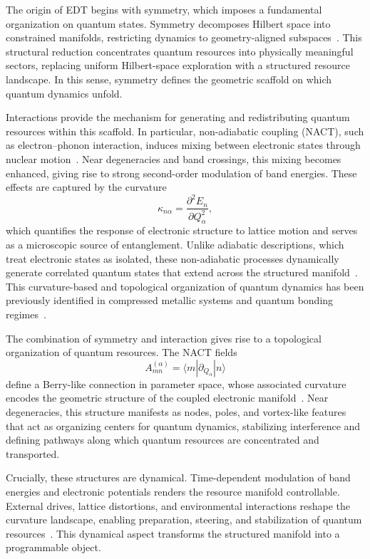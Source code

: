 \documentclass[twocolumn,10pt]{article}
\begin{document}
The origin of EDT begins with symmetry, which imposes a fundamental organization on quantum states. Symmetry decomposes Hilbert space into constrained manifolds, restricting dynamics to geometry-aligned subspaces~\cite{Wigner1959,Georgi1999}. This structural reduction concentrates quantum resources into physically meaningful sectors, replacing uniform Hilbert-space exploration with a structured resource landscape. In this sense, symmetry defines the geometric scaffold on which quantum dynamics unfold.

Interactions provide the mechanism for generating and redistributing quantum resources within this scaffold. In particular, non-adiabatic coupling (NACT), such as electron--phonon interaction, induces mixing between electronic states through nuclear motion~\cite{Mead1979,Yarkony1996}. Near degeneracies and band crossings, this mixing becomes enhanced, giving rise to strong second-order modulation of band energies. These effects are captured by the curvature
\begin{equation}
\kappa_{n\alpha} = \frac{\partial^2 E_n}{\partial Q_\alpha^2},
\end{equation}
which quantifies the response of electronic structure to lattice motion and serves as a microscopic source of entanglement. Unlike adiabatic descriptions, which treat electronic states as isolated, these non-adiabatic processes dynamically generate correlated quantum states that extend across the structured manifold~\cite{BornOppenheimer1927}. This curvature-based and topological organization of quantum dynamics has been previously identified in compressed metallic systems and quantum bonding regimes~\cite{Hu2024_ACP,Hu2025_APQ,Hu2026_JPCM}.

The combination of symmetry and interaction gives rise to a topological organization of quantum resources. The NACT fields
\begin{equation}
A^{(\alpha)}_{mn} = \langle m | \partial_{Q_\alpha} | n \rangle
\end{equation}
define a Berry-like connection in parameter space, whose associated curvature encodes the geometric structure of the coupled electronic manifold~\cite{Berry1984,Xiao2010}. Near degeneracies, this structure manifests as nodes, poles, and vortex-like features that act as organizing centers for quantum dynamics, stabilizing interference and defining pathways along which quantum resources are concentrated and transported.

Crucially, these structures are dynamical. Time-dependent modulation of band energies and electronic potentials renders the resource manifold controllable. External drives, lattice distortions, and environmental interactions reshape the curvature landscape, enabling preparation, steering, and stabilization of quantum resources~\cite{Bukov2015,Eckardt2017}. This dynamical aspect transforms the structured manifold into a programmable object.
\end{document}
